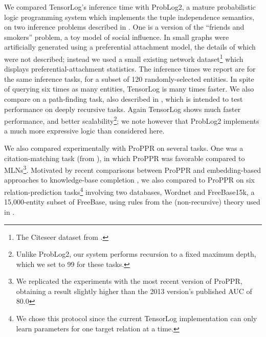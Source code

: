 \documentclass{article}
\newcommand{\cd}[1]{{\small \texttt{#1}}}
\begin{document}

We compared TensorLog's inference time with ProbLog2, a mature
probabilistic logic programming system which implements the tuple
independence semantics, on two inference problems described in
\cite{fierens2016}.  One is a version of the ``friends and smokers''
problem, a toy model of social influence.  In \cite{fierens2016} small
graphs were artificially generated using a preferential attachment
model, the details of which were not described; instead we used a
small existing network dataset\footnote{The Citeseer dataset from
  \cite{DBLP:conf/asunam/LinC10}.} which displays
preferential-attachment statistics.  The inference times we report are
for the same inference tasks, for a subset of 120 randomly-selected
entities.  In spite of querying six times as many entities, TensorLog
is many times faster.  We also compare on a path-finding task, also
described in \cite{fierens2016}, which is intended to test performance
on deeply recursive tasks.  Again TensorLog shows much faster
performance, and better scalability\footnote{Unlike ProbLog2, our
  system performs recursion to a fixed maximum depth, which we set to
  99 for these tasks.}; we note however that ProbLog2 implements a
much more expressive logic than considered here.

We also compared experimentally with ProPPR on several tasks.  One was
a citation-matching task (from \cite{wang2013programming}), in which
ProPPR was favorable compared to MLNs\footnote{We replicated the
  experiments with the most recent version of ProPPR, obtaining a
  result slightly higher than the 2013 version's published AUC of
  80.0}.  Motivated by recent comparisons between ProPPR and
embedding-based approaches to knowledge-base completion
\cite{Wang-Cohen:2016:IJCAI}, we also compared to ProPPR on six
relation-prediction tasks\footnote{We chose this protocol since the
  current TensorLog implementation can only learn parameters for one
  target relation at a time.} involving two databases, Wordnet and
FreeBase15k, a 15,000-entity subset of FreeBase, using rules from the
(non-recursive) theory used in \cite{Wang-Cohen:2016:IJCAI}.
\end{document}
